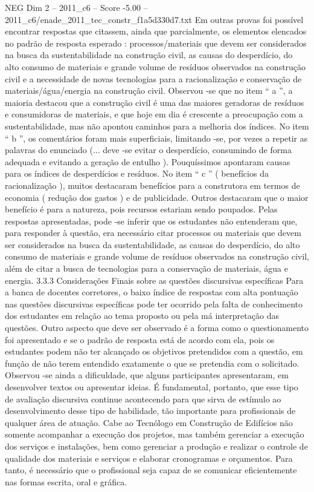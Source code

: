 \begin{textsample}{NEG Dim 2 – 2011\_c6 – Score -5.00 – 2011\_c6/enade\_2011\_tec\_constr\_f1a5d330d7.txt}
Em outras provas foi possível encontrar respostas que citassem, ainda que parcialmente, os elementos elencados no padrão de resposta esperado : processos/materiais que devem ser considerados na busca da sustentabilidade na construção civil, as causas do desperdício, do alto consumo de materiais e grande volume de resíduos observados na construção civil e a necessidade de novas tecnologias para a racionalização e conservação de materiais/água/energia na construção civil.
Observou -se que no item “ a ”, a maioria destacou que a construção civil é uma das maiores geradoras de resíduos e consumidoras de materiais, e que hoje em dia é crescente a preocupação com a sustentabilidade, mas não apontou caminhos para a melhoria dos índices.
No item “ b ”, os comentários foram mais superficiais, limitando -se, por vezes a repetir as palavras do enunciado (... deve -se evitar o desperdício, consumindo de forma adequada e evitando a geração de entulho ).
Pouquíssimos apontaram causas para os índices de desperdícios e resíduos.
No item “ c ” ( benefícios da racionalização ), muitos destacaram benefícios para a construtora em termos de economia ( redução dos gastos ) e de publicidade.
Outros destacaram que o maior benefício é para a natureza, pois recursos estariam sendo poupados.
Pelas respostas apresentadas, pode -se inferir que os estudantes não entenderam que, para responder à questão, era necessário citar processos ou materiais que devem ser considerados na busca da sustentabilidade, as causas do desperdício, do alto consumo de materiais e grande volume de resíduos observados na construção civil, além de citar a busca de tecnologias para a conservação de materiais, água e energia. 3.3.3 Considerações Finais sobre as questões discursivas específicas Para a banca de docentes corretores, o baixo índice de respostas com alta pontuação nas questões discursivas específicas pode ter ocorrido pela falta de conhecimento dos estudantes em relação ao tema proposto ou pela má interpretação das questões.
Outro aspecto que deve ser observado é a forma como o questionamento foi apresentado e se o padrão de resposta está de acordo com ela, pois os estudantes podem não ter alcançado os objetivos pretendidos com a questão, em função de não terem entendido exatamente o que se pretendia com o solicitado.
Observou -se ainda a dificuldade, que alguns participantes apresentaram, em desenvolver textos ou apresentar ideias.
É fundamental, portanto, que esse tipo de avaliação discursiva continue acontecendo para que sirva de estímulo ao desenvolvimento desse tipo de habilidade, tão importante para profissionais de qualquer área de atuação.
Cabe ao Tecnólogo em Construção de Edifícios não somente acompanhar a execução dos projetos, mas também gerenciar a execução dos serviços e instalações, bem como gerenciar a produção e realizar o controle de qualidade dos materiais e serviços e elaborar cronogramas e orçamentos.
Para tanto, é necessário que o profissional seja capaz de se comunicar eficientemente nas formas escrita, oral e gráfica.

\end{textsample}
